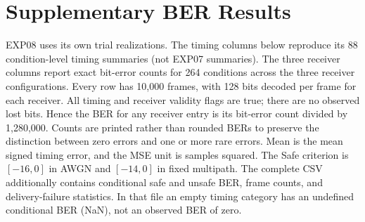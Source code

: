 \clearpage
\chapter[Supplementary BER Results]{Supplementary BER Results}
\label{app:ber}
EXP08 uses its own trial realizations. The timing columns below reproduce
its 88 condition-level timing summaries (not EXP07 summaries). The three
receiver columns report exact bit-error counts for 264 conditions
across the three receiver configurations. Every row has 10,000 frames, with 128 bits decoded per frame
for each receiver. All timing and receiver validity flags are true; there
are no observed lost bits. Hence the BER for any receiver entry is its bit-error
count divided by 1,280,000. Counts are printed rather than rounded BERs to
preserve the distinction between zero errors and one or more rare errors.
Mean is the mean signed timing error, and the MSE unit is samples squared.
The Safe criterion is $[-16,0]$ in AWGN and $[-14,0]$ in fixed multipath.
The complete CSV additionally contains conditional safe and unsafe BER,
frame counts, and delivery-failure statistics. In that file an empty timing
category has an undefined conditional BER (NaN), not an observed BER of zero.

